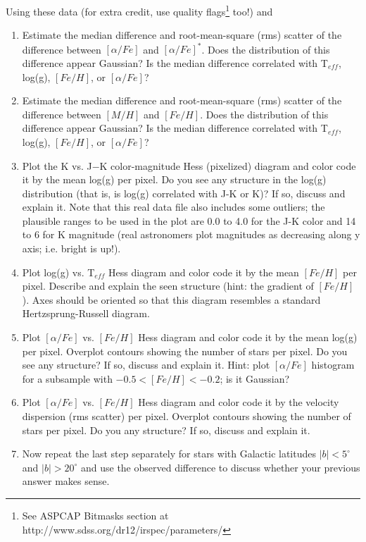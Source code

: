 Using these data (for extra credit, use quality flags\footnote{See ASPCAP Bitmasks section at http://www.sdss.org/dr12/irspec/parameters/} too!) and 
\begin{enumerate}
\item Estimate the median difference and root-mean-square (rms) scatter of the difference between $[\alpha/Fe]$ and $[\alpha/Fe]^\ast$. Does the distribution of this difference appear Gaussian? Is the median difference correlated with T$_{eff}$, log(g), $[Fe/H]$, or $[\alpha/Fe]$? 
\item Estimate the median difference and root-mean-square (rms) scatter of the difference between $[M/H]$ and $[Fe/H]$. 
Does the distribution of this difference appear Gaussian? 
Is the median difference correlated with T$_{eff}$, log(g), $[Fe/H]$, or $[\alpha/Fe]$? 
\item Plot the K vs. J$-$K color-magnitude Hess (pixelized) diagram and color code it by the mean log(g) per pixel.
Do you see any structure in the log(g) distribution (that is, is log(g) correlated with J-K or K)? If so, discuss and explain it. 
Note that this real data file also includes some outliers; the plausible ranges to be used in the plot are 0.0 to 4.0 for 
the J-K color and 14 to 6 for K magnitude (real astronomers plot magnitudes as decreasing along y axis; i.e. bright is up!). 
\item Plot log(g) vs. T$_{eff}$ Hess diagram and color code it by the mean $[Fe/H]$ per pixel.
Describe and explain the seen structure (hint: the gradient of $[Fe/H]$). Axes should be oriented so that 
this diagram resembles a standard Hertzsprung-Russell diagram.  
\item Plot $[\alpha/Fe]$ vs. $[Fe/H]$ Hess diagram and color code it by the mean log(g) per pixel.
Overplot contours showing the number of stars per pixel. Do you see any structure? If so, discuss and explain it. 
Hint: plot $[\alpha/Fe]$ histogram for a subsample with $-0.5 < [Fe/H] < -0.2$; is it Gaussian? 
\item Plot $[\alpha/Fe]$ vs. $[Fe/H]$ Hess diagram and color code it by the velocity dispersion (rms scatter) per pixel.
Overplot contours showing the number of stars per pixel. Do you any structure? If so, discuss and explain it. 
\item Now repeat the last step separately for stars with Galactic latitudes $|b| < 5^\circ$ and $|b| > 20^\circ$ and 
use the observed difference to discuss whether your previous answer makes sense.  
\end{enumerate}



